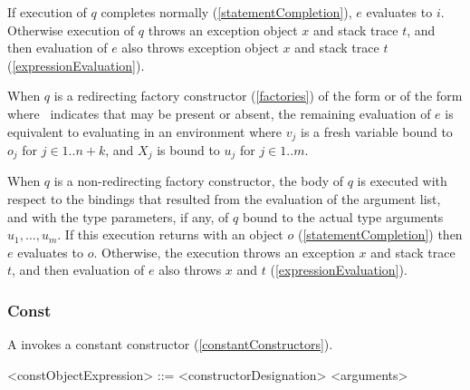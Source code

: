 \documentclass[makeidx]{article}
\begin{document}
{\LMHash{}%
If execution of $q$ completes normally (\ref{statementCompletion}),
$e$ evaluates to $i$.
Otherwise execution of $q$ throws an exception object $x$ and stack trace $t$,
and then evaluation of $e$ also throws exception object $x$ and stack trace $t$
(\ref{expressionEvaluation}).
\EndCase

\LMHash{}%
When $q$ is a redirecting factory constructor
(\ref{factories})
of the form  or
of the form 
where \ indicates that \CONST{} may be present or absent,
the remaining evaluation of $e$ is equivalent to
evaluating
in an environment where
$v_j$ is a fresh variable bound to $o_j$ for $j \in 1 .. n + k$, and
$X_j$ is bound to $u_j$ for $j \in 1 .. m$.
\EndCase

\LMHash{}%
When $q$ is a non-redirecting factory constructor,
the body of $q$ is executed with respect to
the bindings that resulted from the evaluation of the argument list,
and with the type parameters, if any, of $q$ bound to
the actual type arguments $u_1, \ldots, u_m$.
If this execution returns with an object $o$
(\ref{statementCompletion})
then $e$ evaluates to $o$.
Otherwise, the execution throws an exception $x$ and stack trace $t$,
and then evaluation of $e$ also throws $x$ and $t$
(\ref{expressionEvaluation}).


\EndCase


\subsubsection{Const}

\LMHash{}%
A  invokes a constant constructor
(\ref{constantConstructors}).

\begin{grammar}
<constObjectExpression> ::= \CONST{} <constructorDesignation> <arguments>
\end{grammar}

}
\end{document}
